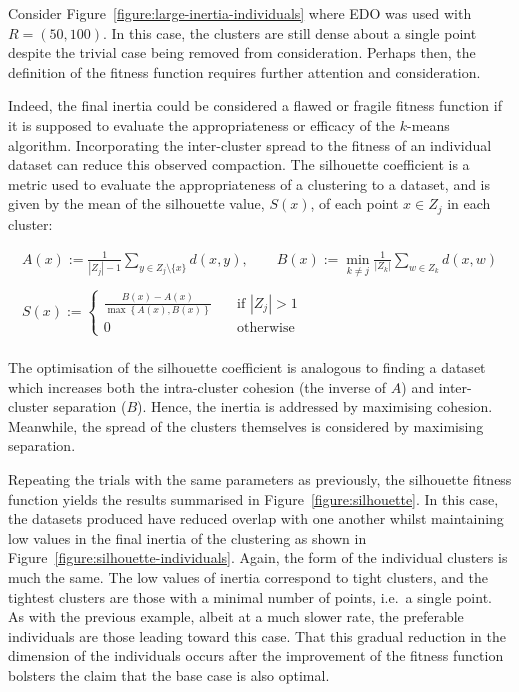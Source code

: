 Consider Figure~\ref{figure:large-inertia-individuals} where EDO was used with
\(R = (50, 100)\). In this case, the clusters are still dense about a single
point despite the trivial case being removed from consideration. Perhaps then,
the definition of the fitness function requires further attention and
consideration.

Indeed, the final inertia could be considered a flawed or fragile fitness
function if it is supposed to evaluate the appropriateness or efficacy of the
\(k\)-means algorithm. Incorporating the inter-cluster spread to the fitness of
an individual dataset can reduce this observed compaction. The silhouette
coefficient is a metric used to evaluate the appropriateness of a clustering to
a dataset, and is given by the mean of the silhouette value, \(S(x)\), of each
point \(x \in Z_j\) in each cluster:

\begin{equation}
    \begin{gathered}
        A(x) := \frac{1}{|Z_j| - 1} \sum_{y \in Z_j \setminus \{x\}} d(x, y),
        \qquad B(x) := \min_{k \neq j} \frac{1}{|Z_k|} \sum_{w \in Z_k} d(x, w)
        \\\\
        S(x) := 
            \begin{cases}
                \frac{B(x) - A(x)}{\max\left\{A(x), B(x)\right\}}
                &\quad \text{if } |Z_j| > 1\\
                0 &\quad \text{otherwise}
            \end{cases}\label{eq:silhouette}
    \end{gathered}
\end{equation}\\

The optimisation of the silhouette coefficient is analogous to finding a dataset
which increases both the intra-cluster cohesion (the inverse of \(A\)) and
inter-cluster separation (\(B\)). Hence, the inertia is addressed by maximising
cohesion. Meanwhile, the spread of the clusters themselves is considered by
maximising separation.

Repeating the trials with the same parameters as previously, the silhouette
fitness function yields the results summarised in
Figure~\ref{figure:silhouette}. In this case, the datasets produced have reduced
overlap with one another whilst maintaining low values in the final inertia of
the clustering as shown in Figure~\ref{figure:silhouette-individuals}. Again,
the form of the individual clusters is much the same. The low values of inertia
correspond to tight clusters, and the tightest clusters are those with a minimal
number of points, i.e.\ a single point. As with the previous example, albeit at
a much slower rate, the preferable individuals are those leading toward this
case. That this gradual reduction in the dimension of the individuals occurs
after the improvement of the fitness function bolsters the claim that the base
case is also optimal.

